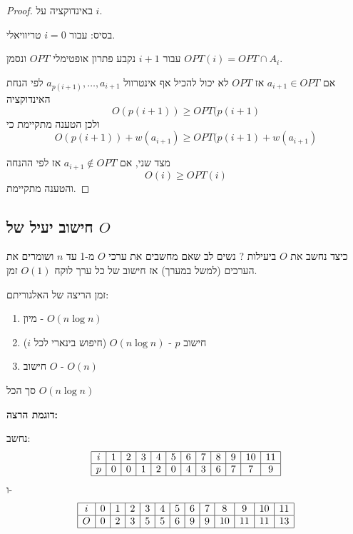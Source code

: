 \begin{proof}
באינדוקציה על $i$.

בסיס: עבור 
$i = 0$
טריוויאלי.

עבור 
$i + 1$
נקבע פתרון אופטימלי $OPT$ ונסמן
$OPT(i) = OPT \cap A_i$. 

אם
$a_{i+1} \in OPT$
אז $OPT$ לא יכול להכיל אף אינטרוול
$a_{p(i+1)}, \ldots, a_{i+1}$
לפי הנחת האינדוקציה
$$O(p(i + 1)) \geq OPT(p(i + 1)$$
ולכן הטענה מתקיימת כי
$$O(p(i + 1)) + w(a_{i+1}) \geq OPT(p(i + 1) + w(a_{i+1})$$

מצד שני, אם 
$a_{i+1} \notin OPT$
אז לפי ההנחה 
$$O(i) \geq OPT(i)$$
והטענה מתקיימת.
\end{proof}

\subsection*{חישוב יעיל של $O$}
כיצד נחשב את $O$ ביעילות ?
נשים לב שאם מחשבים את ערכי $O$ מ-1 עד $n$ ושומרים את הערכים (למשל במערך) אז חישוב של 
כל ערך לוקח 
$O(1)$
זמן.

זמן הריצה של האלגוריתם:
\begin{enumerate}
\item
מיון - 
$O(n\log n)$
\item
חישוב $p$ - 
$O(n\log n)$
(חיפוש בינארי לכל $i$)
\item
חישוב $O$ -
$O(n)$
\end{enumerate}

סך הכל 
$O(n\log n)$

\textbf{דוגמת הרצה:}
\begin{center}
\end{center}

נחשב:
$$
\begin{array}{|c|c|c|c|c|c|c|c|c|c|c|c|}
\hline
i & 1 & 2 & 3 & 4 & 5 & 6 & 7 & 8 & 9 & 10 & 11
\\\hline
p & 0 & 0 & 1 & 2 & 0 & 4 & 3 & 6 & 7 & 7 & 9
\\\hline
\end{array}
$$
ו-%
$$
\begin{array}{|c|c|c|c|c|c|c|c|c|c|c|c|c|c|}
\hline
i & 0 & 1 & 2 & 3 & 4 & 5 & 6 & 7 & 8  & 9  & 10 & 11
\\\hline
O & 0 & 2 & 3 & 5 & 5 & 6 & 9 & 9 & 10 & 11 & 11 & 13
\\\hline
\end{array}
$$


